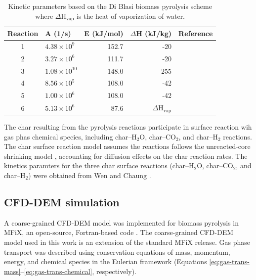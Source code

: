 \documentclass{article}
\begin{document}
\begin{table}[H]
    \centering
    \caption{Kinetic parameters based on the Di Blasi biomass pyrolysis scheme where $\Delta$H$_\text{vap}$ is the heat of vaporization of water.}
    \begin{tabular}{clrrr}
        \toprule
        Reaction & A (1/s) & E (kJ/mol) & $\Delta$H (kJ/kg) & Reference \\
        \midrule
        1 & $4.38 \times 10^9$    & 152.7 & -20                    & \cite{Blasi-2001} \\
        2 & $3.27 \times 10^6$    & 111.7 & -20                    & \cite{Blasi-2001} \\
        3 & $1.08 \times 10^{10}$ & 148.0 & 255                    & \cite{Blasi-2001} \\
        4 & $8.56 \times 10^5$    & 108.0 & -42                    & \cite{Blasi-1993,lu2020bridging} \\
        5 & $1.00 \times 10^6$    & 108.0 & -42                    & \cite{Blasi-1993} \\
        6 & $5.13 \times 10^6$    & 87.6  & $\Delta$H$_\text{vap}$ & \cite{Chan-1985} \\
        \bottomrule
    \end{tabular}
    \label{tab:kinetic-params}
\end{table}

\noindent The char resulting from the pyrolysis reactions participate in surface reaction wih gas phas chemical species, including char--H$_2$O, char--CO$_2$, and char--H$_2$ reactions. The char surface reaction model assumes the reactions follows the unreacted-core shrinking model \cite{Chyou-2013}, accounting for diffusion effects on the char reaction rates. The kinetics paramters for the three char surface reactions (char--H$_2$O, char--CO$_2$, and char--H$_2$) were obtained from Wen and Chaung \cite{Wen1979entr}.

\subsection{CFD-DEM simulation}

A coarse-grained CFD-DEM model was implemented for biomass pyrolysis in MFiX, an open-source, Fortran-based code \cite{Syamlal-1993}. The coarse-grained CFD-DEM model used in this work is an extension of the standard MFiX release. Gas phase transport was described using conservation equations of mass, momentum, energy, and chemical species in the Eulerian framework (Equations \ref{eq:gas-trans-mass}--\ref{eq:gas-trans-chemical}, respectively).
\end{document}
